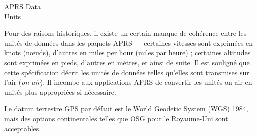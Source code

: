\begin{aprssideblock}{APRS Data\\Units}
\label{unituxe9s-de-donnuxe9es-aprs}
Pour des raisons historiques, il existe un certain manque de cohérence entre
les unités de données dans les paquets APRS --- certaines vitesses sont
exprimées en knots (nœuds), d'autres en miles per hour (miles par heure) ;
certaines altitudes sont exprimées en pieds, d'autres en mètres, et ainsi de
suite. Il est souligné que cette spécification décrit les unités de données
telles qu'elles sont transmises sur l'air (\emph{on-air}). Il incombe aux
applications APRS de convertir les unités on-air en unités plus appropriées
si nécessaire.

Le datum terrestre GPS par défaut est le World Geodetic System (WGS) 1984,
mais des options continentales telles que OSG pour le Royaume-Uni sont
acceptables.
\end{aprssideblock}

